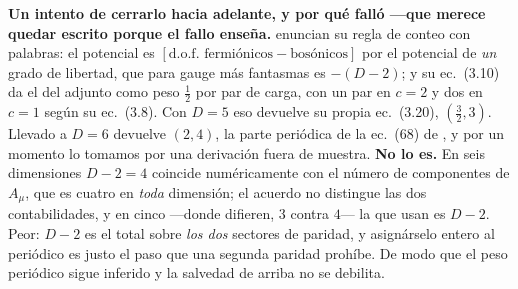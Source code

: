 \documentclass[11pt,a4paper]{article}
\begin{document}
\noindent \textbf{Un intento de cerrarlo hacia adelante, y por qué falló ---que merece quedar
escrito porque el fallo enseña.} \cite{HY04} enuncian su regla de conteo con palabras: el potencial
es $[\text{d.o.f. fermiónicos}-\text{bosónicos}]$ por el potencial de \emph{un} grado de libertad,
que para gauge más fantasmas es $-(D-2)$; y su ec.~(3.10) da el del adjunto como peso $\tfrac12$
por par de carga, con un par en $c=2$ y dos en $c=1$ según su ec.~(3.8). Con $D=5$ eso devuelve su
propia ec.~(3.20), $(\tfrac32,3)$. Llevado a $D=6$ devuelve $(2,4)$, la parte periódica de la
ec.~(68) de \cite{KM25}, y por un momento lo tomamos por una derivación fuera de muestra.
\textbf{No lo es.} En seis dimensiones $D-2=4$ coincide numéricamente con el número de componentes
de $A_\mu$, que es cuatro en \emph{toda} dimensión; el acuerdo no distingue las dos contabilidades,
y en cinco ---donde difieren, $3$ contra $4$--- la que \cite{HY04} usan es $D-2$. Peor: $D-2$ es el
total sobre \emph{los dos} sectores de paridad, y asignárselo entero al periódico es justo el paso
que una segunda paridad prohíbe. De modo que el peso periódico sigue inferido y la salvedad de
arriba no se debilita.
\end{document}

